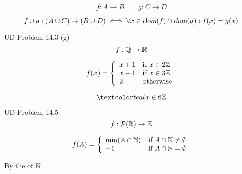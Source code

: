 \begin{frame}{}
  \[
    f: A \to B \qquad g: C \to D
  \]

  \begin{center}
  \end{center}

  \pause
  \begin{theorem}
    \[
      f \cup g: (A \cup C) \to (B \cup D) \iff
      \forall x \in \textsl{dom}(f) \cap \textsl{dom}(g): f(x) = g(x)
    \]
  \end{theorem}

  \pause
  \begin{exampleblock}{UD Problem 14.3 (g)}
    \[
      f: \mathbb{Q} \to \mathbb{R}{}
    \]

    \[
      f(x) = \left\{\begin{array}{ll}
	x + 1 & \text{if } x \in 2\mathbb{Z}{} \\
	x - 1 & \text{if } x \in 3\mathbb{Z}{} \\
	2     & \text{otherwise}
      \end{array}\right.
    \]
  \end{exampleblock}

  \pause
  \vspace{-0.30cm}
  \[
    \teal{x \in 6\integer{}}
  \]
\end{frame}

\begin{frame}{}
  \begin{exampleblock}{UD Problem 14.5}
    \[
      f: \mathcal{P}(\mathbb{R}{}) \to \mathbb{Z}{}
    \]

    \[
      f(A) = \left\{\begin{array}{ll}
	\min(A \cap \mathbb{N}{}) & \text{if } A \cap \mathbb{N}{} \neq \emptyset \\
	-1 & \text{if } A \cap \mathbb{N}{} = \emptyset
      \end{array}\right.
    \]
  \end{exampleblock}

  \pause
  \vspace{0.50cm}
  \begin{center}
    By the  of $\mathbb{N}{}$
  \end{center}
\end{frame}

